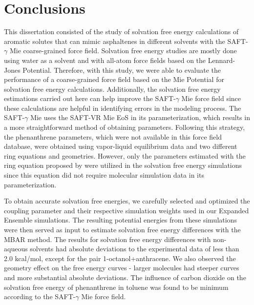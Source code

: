 \chapter{Conclusions} %

\label{Chapter6} 

This dissertation consisted of the study of solvation free energy calculations of aromatic solutes that can mimic asphaltenes in different solvents with the SAFT-$\gamma$ Mie coarse-grained force field. Solvation free energy studies are mostly done using water as a solvent and with all-atom force fields based on the Lennard-Jones Potential. Therefore, with this study, we were able to evaluate the performance of a coarse-grained force field based on the Mie Potential for solvation free energy calculations. Additionally, the solvation free energy estimations carried out here can help improve the SAFT-$\gamma$  Mie force field since these calculations are helpful in identifying errors in the modeling process. The SAFT-$\gamma$ Mie uses the SAFT-VR Mie EoS in its parameterization, which results in a more straightforward method of obtaining parameters. Following this strategy, the phenanthrene parameters, which were not available in this force field database, were obtained using vapor-liquid equilibrium data and two different ring equations and geometries. However, only the parameters estimated with the ring equation proposed by  were utilized in the solvation free energy simulations since this equation did not require molecular simulation data in its parameterization.

To obtain accurate solvation free energies, we carefully selected and optimized the coupling parameter and their respective simulation weights used in our Expanded Ensemble simulations. The resulting potential energies from these simulations were then served as input to estimate solvation free energy differences with the MBAR method. The results for solvation free energy differences with non-aqueous solvents had absolute deviations to the experimental
data of less than 2.0 kcal/mol, except for the pair 1-octanol+anthracene. We also observed the geometry effect on the free energy curves - larger molecules had steeper curves and more substantial absolute deviations. The influence of carbon dioxide on the solvation free energy of phenanthrene in toluene was found to be minimum according to the SAFT-$\gamma$ Mie force field. 

